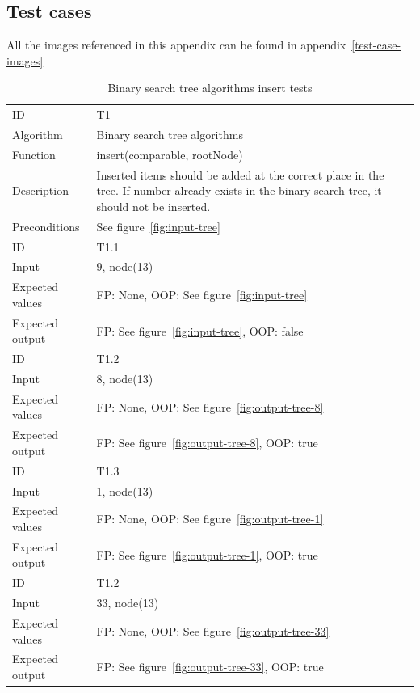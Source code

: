 \documentclass {article}
\begin{document}
\subsection{Test cases}
All the images referenced in this appendix can be found in appendix~\ref{test-case-images}
\begin{table}[H]
\caption{Binary search tree algorithms insert tests}
\begin{tabular}{ | l p{10cm} | }
\hline
ID & T1 \\
Algorithm & Binary search tree algorithms \\
Function & insert(comparable, rootNode) \\
Description & Inserted items should be added at the correct place in the tree. If number already exists in the binary search tree, it should not be inserted. \\
Preconditions & See figure~\ref{fig:input-tree} \\
\hline
ID & T1.1 \\
Input & 9, node(13) \\
Expected values & FP: None, OOP: See figure~\ref{fig:input-tree} \\
Expected output & FP: See figure~\ref{fig:input-tree}, OOP: false \\
\hline
ID & T1.2 \\
Input & 8, node(13) \\
Expected values & FP: None, OOP: See figure~\ref{fig:output-tree-8} \\
Expected output & FP: See figure~\ref{fig:output-tree-8}, OOP: true \\
\hline
ID & T1.3 \\
Input & 1, node(13) \\
Expected values & FP: None, OOP: See figure~\ref{fig:output-tree-1} \\
Expected output & FP: See figure~\ref{fig:output-tree-1}, OOP: true \\
\hline
ID & T1.2 \\
Input & 33, node(13) \\
Expected values & FP: None, OOP: See figure~\ref{fig:output-tree-33} \\
Expected output & FP: See figure~\ref{fig:output-tree-33}, OOP: true \\
\hline
\end{tabular}
\label{tab:insert-tests}
\end{table}
 
\end{document}

